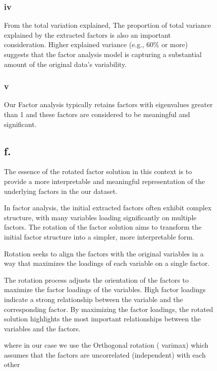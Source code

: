 \documentclass[english,10pt,a4paper]{article}
\begin{document}
\begin{figure}
	
		\subsubsection*{iv}
	From the total variation explained, The proportion of total variance explained by the extracted factors is also an important consideration. Higher explained variance (e.g., 60\% or more) suggests that the factor analysis model is capturing a substantial amount of the original data's variability.
	
	
	\subsubsection*{v}
	
Our Factor analysis typically retains factors with eigenvalues greater than 1 and these factors are considered to be meaningful and significant.	


\subsection*{f.}
The essence of the rotated factor solution in this context is to provide a more interpretable and meaningful representation of the underlying factors in the our dataset.

In factor analysis, the initial extracted factors often exhibit complex structure, with many variables loading significantly on multiple factors. The rotation of the factor solution aims to transform the initial factor structure into a simpler, more interpretable form.	
 
 Rotation seeks to align the factors with the original variables in a way that maximizes the loadings of each variable on a single factor.
 
 The rotation process adjusts the orientation of the factors to maximize the factor loadings of the variables.
 High factor loadings indicate a strong relationship between the variable and the corresponding factor.
 By maximizing the factor loadings, the rotated solution highlights the most important relationships between the variables and the factors.
 
 where in our case we use the Orthogonal rotation ( varimax) which assumes that the factors are uncorrelated (independent) with each other
 
\end{figure}
\end{document}
